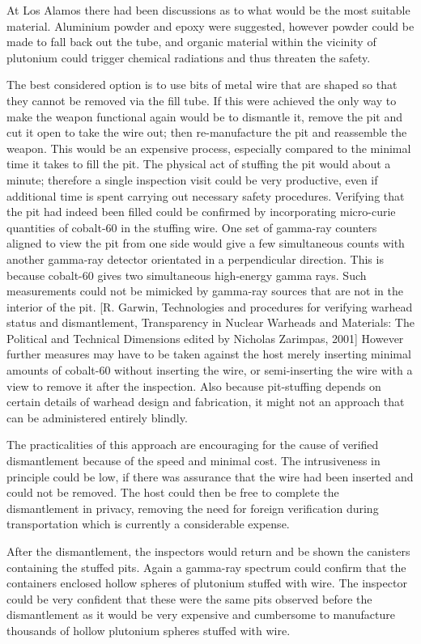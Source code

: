 \documentclass[twocolumn,a4paper]{article}
\begin{document}
At Los Alamos there had been discussions as to what would be the most
suitable material. Aluminium powder and epoxy were suggested, however
powder could be made to fall back out the tube, and organic material
within the vicinity of plutonium could trigger chemical radiations and
thus threaten the safety.

The best considered option is to use bits of metal wire that are
shaped so that they cannot be removed via the fill tube.  If this were
achieved the only way to make the weapon functional again would be to
dismantle it, remove the pit and cut it open to take the wire out;
then re-manufacture the pit and reassemble the weapon. This would be an
expensive process, especially compared to the minimal time it takes to
fill the pit.  The physical act of stuffing the pit would about a
minute; therefore a single inspection visit could be very productive,
even if additional time is spent carrying out necessary safety
procedures.  Verifying that the pit had indeed been filled could be
confirmed by incorporating micro-curie quantities of cobalt-60 in the
stuffing wire. One set of gamma-ray counters aligned to view the pit
from one side would give a few simultaneous counts with another
gamma-ray detector orientated in a perpendicular direction.  This is
because cobalt-60 gives two simultaneous high-energy gamma rays. Such
measurements could not be mimicked by gamma-ray sources that are not
in the interior of the pit.  [R. Garwin, Technologies and procedures
  for verifying warhead status and dismantlement, Transparency in
  Nuclear Warheads and Materials: The Political and Technical
  Dimensions edited by Nicholas Zarimpas, 2001] However further
measures may have to be taken against the host merely inserting
minimal amounts of cobalt-60 without inserting the wire, or
semi-inserting the wire with a view to remove it after the
inspection. Also because pit-stuffing depends on certain details of
warhead design and fabrication, it might not an approach that can be
administered entirely blindly.

The practicalities of this approach are encouraging for the cause of
verified dismantlement because of the speed and minimal cost. The
intrusiveness in principle could be low, if there was assurance that
the wire had been inserted and could not be removed. The host could
then be free to complete the dismantlement in privacy, removing the
need for foreign verification during transportation which is currently
a considerable expense.

After the dismantlement, the inspectors would return and be shown the
canisters containing the stuffed pits. Again a gamma-ray spectrum
could confirm that the containers enclosed hollow spheres of plutonium
stuffed with wire. The inspector could be very confident that these
were the same pits observed before the dismantlement as it would be
very expensive and cumbersome to manufacture thousands of hollow
plutonium spheres stuffed with wire.
\end{document}
